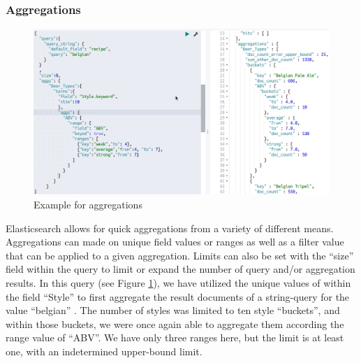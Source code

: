 \documentclass[bibliography=totoc]{article}
\begin{document}
 \subsubsection{Aggregations}
 \begin{figure}
    \includegraphics[height=0.6\textwidth]{beer_aggregations.png}
    \caption{\label{beer_aggregations}Example for aggregations} 
 \end{figure}
 Elasticsearch allows for quick aggregations from a variety of different means. 
 Aggregations can made on unique field values or ranges as well as a filter 
 value that can be applied to a given aggregation. 
 Limits can also be set with the “size” field within the query to limit or 
 expand the number of query and/or aggregation results.
 In this query (see Figure \ref{beer_aggregations}), we have utilized the unique values of within the field 
 “Style” to first aggregate the result documents of a string-query 
 for the value “belgian” . The number of styles was limited to ten 
 style “buckets”, and within those buckets, we were once again able 
 to aggregate them according the range value of “ABV”. 
 We have only three ranges here, but the limit is at least one, 
 with an indetermined upper-bound limit. 
\end{document}
